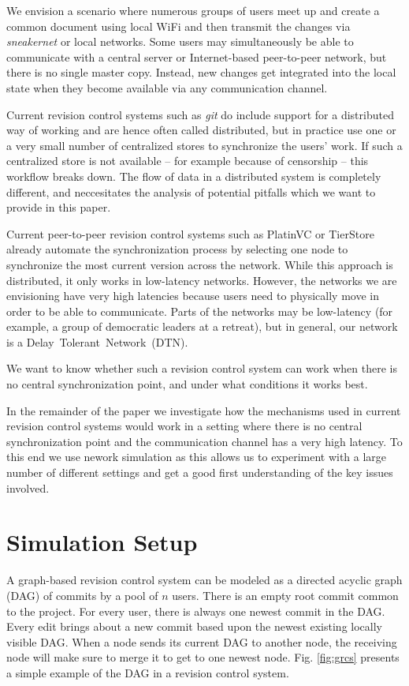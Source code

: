 \documentclass[conference,a4paper]{IEEEtran}
\begin{document}
We envision a scenario where numerous groups of users meet up and create a common document using local WiFi and then transmit the changes via \textit{sneakernet} or local networks. Some users may simultaneously be able to communicate with a central server or Internet-based peer-to-peer network, but there is no single master copy. Instead, new changes get integrated into the local state when they become available via any communication channel.

Current revision control systems such as \textit{git} do include support for a distributed way of working and are hence often called distributed, but in practice use one or a very small number of centralized stores to synchronize the users' work. If such a centralized store is not available -- for example because of censorship -- this workflow breaks down. The flow of data in a distributed system is completely different, and neccesitates the analysis of potential pitfalls which we want to provide in this paper.

Current peer-to-peer revision control systems such as PlatinVC\cite{mukherjee2005fully} or TierStore\cite{demmer2008tierstore} already automate the synchronization process by selecting one node to synchronize the most current version across the network. While this approach is distributed, it only works in low-latency networks. However, the networks we are envisioning have very high latencies because users need to physically move in order to be able to communicate. Parts of the networks may be low-latency (for example, a group of democratic leaders at a retreat), but in general, our network is a Delay~Tolerant~Network~(DTN).

We want to know whether such a revision control system can work when there is no central synchronization point, and under what conditions it works best.

In the remainder of the paper we investigate how the mechanisms used in current revision control systems would work in a setting where there is no central synchronization point and the communication channel has a very high latency. To this end we use nework simulation as this allows us to experiment with a large number of different settings and get a good first understanding of the key issues involved.  

\section{Simulation Setup}

A graph-based revision control system can be modeled as a directed acyclic graph (DAG) of commits by a pool of $n$ users. There is an empty root commit common to the project. For every user, there is always one newest commit in the DAG. Every edit brings about a new commit based upon the newest existing locally visible DAG. When a node sends its current DAG to another node, the receiving node will make sure to merge it to get to one newest node. Fig. \ref{fig:grcs} presents a simple example of the DAG in a revision control system.
\end{document}
